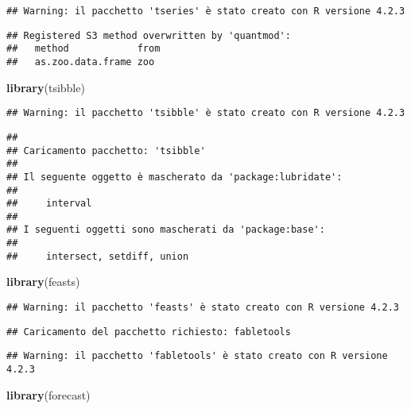 \documentclass[
]{article}
\newenvironment{Shaded}{\begin{snugshade}}{\end{snugshade}}
\newcommand{\FunctionTok}[1]{\textcolor[rgb]{0.13,0.29,0.53}{\textbf{#1}}}
\newcommand{\NormalTok}[1]{#1}
\begin{document}
\begin{verbatim}
## Warning: il pacchetto 'tseries' è stato creato con R versione 4.2.3
\end{verbatim}

\begin{verbatim}
## Registered S3 method overwritten by 'quantmod':
##   method            from
##   as.zoo.data.frame zoo
\end{verbatim}

\begin{Shaded}
\begin{Highlighting}[]
\FunctionTok{library}\NormalTok{(tsibble)}
\end{Highlighting}
\end{Shaded}

\begin{verbatim}
## Warning: il pacchetto 'tsibble' è stato creato con R versione 4.2.3
\end{verbatim}

\begin{verbatim}
## 
## Caricamento pacchetto: 'tsibble'
## 
## Il seguente oggetto è mascherato da 'package:lubridate':
## 
##     interval
## 
## I seguenti oggetti sono mascherati da 'package:base':
## 
##     intersect, setdiff, union
\end{verbatim}

\begin{Shaded}
\begin{Highlighting}[]
\FunctionTok{library}\NormalTok{(feasts)}
\end{Highlighting}
\end{Shaded}

\begin{verbatim}
## Warning: il pacchetto 'feasts' è stato creato con R versione 4.2.3
\end{verbatim}

\begin{verbatim}
## Caricamento del pacchetto richiesto: fabletools
\end{verbatim}

\begin{verbatim}
## Warning: il pacchetto 'fabletools' è stato creato con R versione 4.2.3
\end{verbatim}

\begin{Shaded}
\begin{Highlighting}[]
\FunctionTok{library}\NormalTok{(forecast)}
\end{Highlighting}
\end{Shaded}
\end{document}
